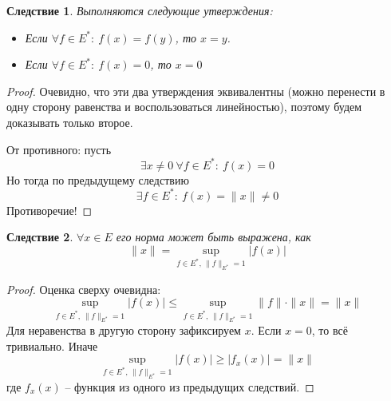 \documentclass[a4paper,12pt]{article}
\renewcommand{\leq}{\ensuremath{\leqslant}}
\renewcommand{\geq}{\ensuremath{\geqslant}}
\theoremstyle{plain}
\newtheorem*{corollary}{Следствие}
\theoremstyle{definition}
\theoremstyle{remark}
\begin{document}
\begin{corollary}
	Выполняются следующие утверждения:
	\begin{itemize}
		\item Если $\forall f \in E^* :\: f(x) = f(y)$, то $x = y$.
		\item Если $\forall f \in E^* :\: f(x) = 0$, то $x = 0$
	\end{itemize}
\end{corollary}

\begin{proof}
	Очевидно, что эти два утверждения эквивалентны (можно перенести в одну сторону равенства и воспользоваться линейностью), поэтому будем доказывать только второе.

	От противного: пусть
	\[
		\exists x \neq 0 \: \forall f \in E^* :\: f(x) = 0
	\]
	Но тогда по предыдущему следствию
	\[
		\exists f \in E^* :\: f(x) = \|x\| \neq 0
	\]
	Противоречие!
\end{proof}

\begin{corollary}
	$\forall x \in E$ его норма может быть выражена, как
	\[
		\|x\| = \sup_{f \in E^*,\, \|f\|_{E^*} = 1} \vert f(x)\vert
	\]
\end{corollary}

\begin{proof}
	Оценка сверху очевидна:
	\[
		\sup_{f \in E^*,\, \|f\|_{E^*} = 1}\vert f(x)\vert \leq \sup_{f \in E^*,\, \|f\|_{E^*} = 1} \|f\|\cdot\|x\| = \|x\|
	\]
	Для неравенства в другую сторону зафиксируем $x$. Если $x = 0$, то всё тривиально. Иначе
	\[
		\sup_{f \in E^*,\, \|f\|_{E^*} = 1} \vert f(x)\vert \geq \vert f_x(x)\vert = \|x\|
	\]
	где $f_x(x)$ -- функция из одного из предыдущих следствий.
\end{proof}
\end{document}
